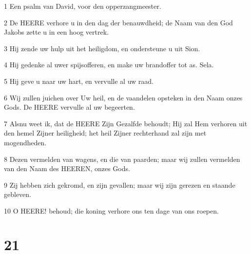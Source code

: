 \par 1 Een psalm van David, voor den opperzangmeester.
\par 2 De HEERE verhore u in den dag der benauwdheid; de Naam van den God Jakobs zette u in een hoog vertrek.
\par 3 Hij zende uw hulp uit het heiligdom, en ondersteune u uit Sion.
\par 4 Hij gedenke al uwer spijsofferen, en make uw brandoffer tot as. Sela.
\par 5 Hij geve u naar uw hart, en vervulle al uw raad.
\par 6 Wij zullen juichen over Uw heil, en de vaandelen opsteken in den Naam onzes Gods. De HEERE vervulle al uw begeerten.
\par 7 Alsnu weet ik, dat de HEERE Zijn Gezalfde behoudt; Hij zal Hem verhoren uit den hemel Zijner heiligheid; het heil Zijner rechterhand zal zijn met mogendheden.
\par 8 Dezen vermelden van wagens, en die van paarden; maar wij zullen vermelden van den Naam des HEEREN, onzes Gods.
\par 9 Zij hebben zich gekromd, en zijn gevallen; maar wij zijn gerezen en staande gebleven.
\par 10 O HEERE! behoud; die koning verhore ons ten dage van ons roepen.

\chapter{21}

